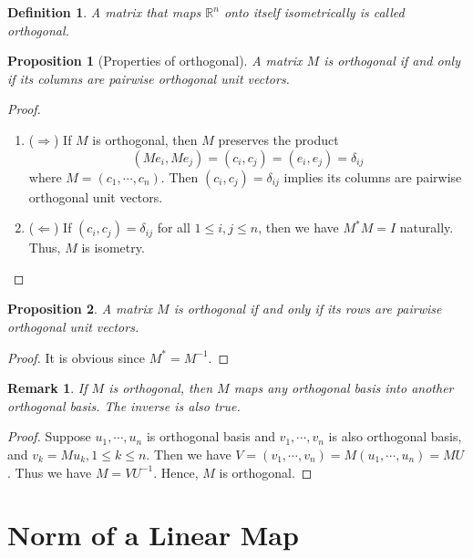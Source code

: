 \documentclass[11pt]{book}
\newtheorem{definition}{Definition}[section]
\newtheorem{proposition}{Proposition}[section]
\newtheorem{remark}{Remark}[section]
\theoremstyle{definition}
\numberwithin{equation}{subsection}
\begin{document}
\medskip

\begin{definition}
A matrix that maps $\mathbb{R}^n$ onto itself isometrically is called orthogonal.
\end{definition}

\medskip

\begin{proposition}[Properties of orthogonal]
A matrix $M$ is orthogonal if and only if its columns are pairwise orthogonal unit vectors.
\end{proposition}
\begin{proof}
~\begin{enumerate}[label=(\arabic*)]
    \item ($\Rightarrow$) If $M$ is orthogonal, then $M$ preserves the product $$(Me_i, Me_j) = (c_i, c_j) = (e_i,e_j) = \delta_{ij}$$ 
    where $M = (c_1,\cdots,c_n)$. Then $(c_i, c_j) = \delta_{ij}$ implies its columns are pairwise orthogonal unit vectors.
    \item ($\Leftarrow$) If $(c_i, c_j) = \delta_{ij}$ for all $1\leq i, j\leq n$, then we have $M^* M = I$ naturally. Thus, $M$ is isometry.
\end{enumerate}
\end{proof}

\medskip

\begin{proposition}
A matrix $M$ is orthogonal if and only if its rows are pairwise orthogonal unit vectors.
\end{proposition}
\begin{proof}
It is obvious since $M^* = M^{-1}$.
\end{proof}

\begin{remark}
If $M$ is orthogonal, then $M$ maps any orthogonal basis into another orthogonal basis. The inverse is also true.
\end{remark}
\begin{proof}
Suppose $u_1,\cdots,u_n$ is orthogonal basis and $v_1,\cdots,v_n$ is also orthogonal basis, and $v_k = Mu_k, 1\leq k \leq n$. Then we have
$V = (v_1,\cdots,v_n) = M (u_1,\cdots,u_n) = MU$. Thus we have $M = VU^{-1}$. Hence, $M$ is orthogonal.
\end{proof}

\medskip

\section{Norm of a Linear Map}
\end{document}
